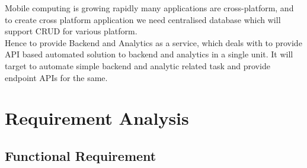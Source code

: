 \documentclass[a4paper,12pt]{report}
\begin{document}
    Mobile computing is growing rapidly many applications are cross-platform, and to create cross platform application we need centralised database which will support CRUD for various platform.\\
    Hence to provide Backend and Analytics as a service, which deals with to provide API based automated solution to backend and analytics in a single unit. It will target to automate simple backend and analytic related task and provide endpoint APIs for the same.\\    
    \section{Requirement Analysis}    
    \subsection{Functional Requirement}
\end{document}
